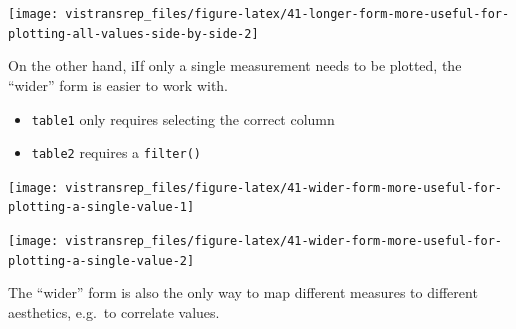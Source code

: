 \documentclass[]{book}
\newenvironment{Shaded}{}{}
\newcommand{\KeywordTok}[1]{\textcolor[rgb]{0.00,0.00,1.00}{#1}}
\newcommand{\NormalTok}[1]{#1}
\newcommand{\OperatorTok}[1]{#1}
\newcommand{\StringTok}[1]{\textcolor[rgb]{0.00,0.50,0.50}{#1}}
\providecommand{\tightlist}{%
  \setlength{\itemsep}{0pt}\setlength{\parskip}{0pt}}
\begin{document}
\begin{flushright}\texttt{[image: vistransrep\_files/figure-latex/41-longer-form-more-useful-for-plotting-all-values-side-by-side-2]} \end{flushright}

On the other hand, iIf only a single measurement needs to be plotted, the ``wider'' form is easier to work with.

\begin{itemize}
\tightlist
\item
  \texttt{table1} only requires selecting the correct column
\item
  \texttt{table2} requires a \texttt{filter()}
\end{itemize}

\begin{Shaded}
\end{Shaded}

\begin{flushright}\texttt{[image: vistransrep\_files/figure-latex/41-wider-form-more-useful-for-plotting-a-single-value-1]} \end{flushright}

\begin{Shaded}
\end{Shaded}

\begin{flushright}\texttt{[image: vistransrep\_files/figure-latex/41-wider-form-more-useful-for-plotting-a-single-value-2]} \end{flushright}

The ``wider'' form is also the only way to map different measures to different aesthetics, e.g.~to correlate values.
\end{document}
